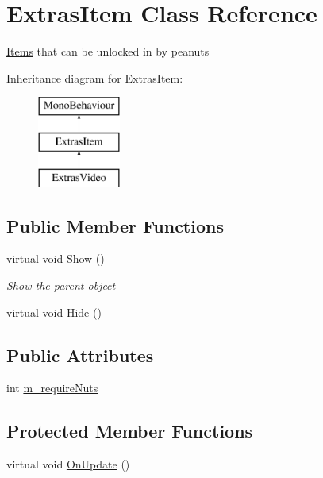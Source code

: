 \hypertarget{class_extras_item}{}\section{Extras\+Item Class Reference}
\label{class_extras_item}


\mbox{\hyperlink{class_items}{Items}} that can be unlocked in by peanuts  


Inheritance diagram for Extras\+Item\+:\begin{figure}[H]
\begin{center}
\leavevmode
\includegraphics[height=3.000000cm]{class_extras_item}
\end{center}
\end{figure}
\subsection*{Public Member Functions}
\begin{DoxyCompactItemize}
\item 
virtual void \mbox{\hyperlink{class_extras_item_a1ea08ab5d840866f8829d37d8149c277}{Show}} ()
\begin{DoxyCompactList}\small\item\em Show the parent object \end{DoxyCompactList}\item 
virtual void \mbox{\hyperlink{class_extras_item_ac209e4ed8ec16d9ad9f24eba19057fe2}{Hide}} ()
\end{DoxyCompactItemize}
\subsection*{Public Attributes}
\begin{DoxyCompactItemize}
\item 
int \mbox{\hyperlink{class_extras_item_aaf6ca43462a0d750cb8e5486b2dff5b5}{m\+\_\+require\+Nuts}}
\end{DoxyCompactItemize}
\subsection*{Protected Member Functions}
\begin{DoxyCompactItemize}
\item 
virtual void \mbox{\hyperlink{class_extras_item_ae6382773509ab96a451613b5bcaee0d8}{On\+Update}} ()
\end{DoxyCompactItemize}
